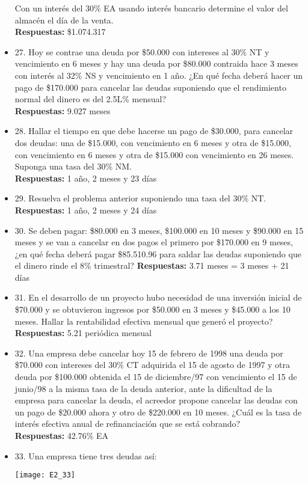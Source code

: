 \begin{itemize}
	Con un interés del 30\% EA usando interés bancario determine el valor del almacén el día de la venta.\\
	\textbf{Respuestas:} \$1.074.317
	\medskip
	
	\item 27. Hoy se contrae una deuda por \$50.000 con intereses al 30\% NT y vencimiento en 6 meses y hay una deuda por \$80.000 contraida hace 3 meses con interés al 32\% NS y vencimiento en 1 año. ¿En qué fecha deberá hacer un pago de \$170.000 para cancelar las deudas suponiendo que el rendimiento normal del dinero es del 2.5L\% mensual?\\
	\textbf{ Respuestas:} 9.027 meses
	\medskip
	
	\item 28. Hallar el tiempo en que debe hacerse un pago de \$30.000, para cancelar dos deudas: una de \$15.000, con vencimiento en 6 meses y otra de \$15.000, con vencimiento en 6 meses y otra de \$15.000 con vencimiento en 26 meses. Suponga una tasa del 30\% NM.\\
	\textbf{Respuestas:} 1 año, 2 meses y 23 días
	\medskip
	
	\item 29. Resuelva el problema anterior suponiendo una tasa del 30\% NT.\\
	\textbf{Respuestas:} 1 año, 2 meses y 24 días
	\medskip
	
	\item 30. Se deben pagar: \$80.000 en 3 meses, \$100.000 en 10 meses y \$90.000 en 15 meses y se van a cancelar en dos pagos el primero por \$170.000 en 9 meses,  ¿en qué fecha deberá pagar \$85.510.96 para saldar las deudas suponiendo que el dinero rinde el 8\% trimestral?
	\textbf{Respuestas:} 3.71 meses = 3 meses + 21 días
	\medskip
	
	\item 31. En el desarrollo de un proyecto hubo necesidad de una inversión inicial de \$70.000 y se obtuvieron ingresos por \$50.000 en 3 meses y \$45.000 a los 10 meses. Hallar la rentabilidad efectiva mensual que generó el proyecto?\\
	\textbf{Respuestas:} 5.21 periódica mensual
	\medskip
	
	\item 32. Una empresa debe cancelar hoy 15 de febrero de 1998 una deuda por \$70.000 con intereses del 30\% CT adquirida el 15 de agosto de 1997 y otra deuda por \$100.000 obtenida el 15 de diciembre/97 con vencimiento el 15 de junio/98 a la misma tasa de la deuda anterior, ante la dificultad de la empresa para cancelar la deuda, el acreedor propone cancelar las deudas con un pago de \$20.000 ahora y otro de \$220.000 en 10 meses. ¿Cuál es la tasa de interés efectiva anual de refinanciación que se está cobrando?\\
	\textbf{Respuestas:} 42.76\% EA
	\medskip
	
	\item 33. Una empresa tiene tres deudas así:
	\begin{center}
		\texttt{[image: E2\_33]}
	\end{center}
	
\end{itemize}
\newpage


